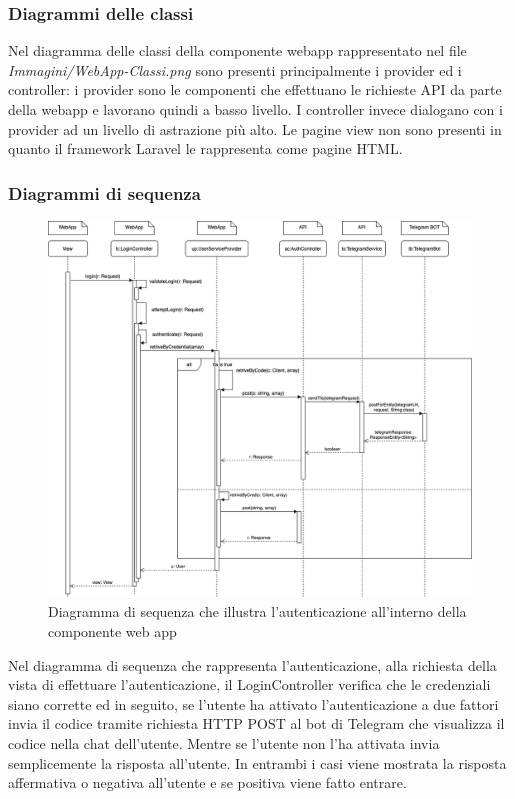 	\subsubsection{Diagrammi delle classi}%
	Nel diagramma delle classi della componente webapp rappresentato nel file \textit{Immagini/WebApp-Classi.png} sono presenti principalmente i provider ed i controller: i provider sono le componenti che effettuano le richieste API da parte della webapp e lavorano quindi a basso livello. I controller invece dialogano con i provider ad un livello di astrazione più alto. Le pagine view non sono presenti in quanto il framework Laravel le rappresenta come pagine HTML.
	\begin{landscape}
	\subsubsection{Diagrammi di sequenza}%
		\begin{figure}[H]
			\centering
			\includegraphics[scale=0.400]{res/images/WEBAPP/AutenticazioneTfa.png}
			\caption{Diagramma di sequenza che illustra l'autenticazione all'interno della componente web app}
			\label{Diagramma 23}
		\end{figure}
		Nel diagramma di sequenza che rappresenta l'autenticazione, alla richiesta della vista di effettuare l'autenticazione, il LoginController verifica che le credenziali siano corrette ed in seguito, se l'utente ha attivato l'autenticazione a due fattori invia il codice tramite richiesta HTTP POST al bot di Telegram che visualizza il codice nella chat dell'utente. Mentre se l'utente non l'ha attivata invia semplicemente la risposta all'utente. In entrambi i casi viene mostrata la risposta affermativa o negativa all'utente e se positiva viene fatto entrare.

\end{landscape}
